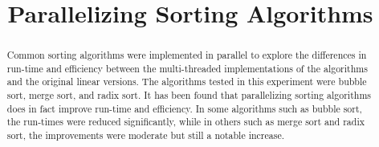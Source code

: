 \documentclass[conference]{IEEEtran}
\begin{document}
\title{Parallelizing Sorting Algorithms}

\author{
\and
{}
\and
{}
\and
{}
\and
{}
}

\maketitle

\begin{abstract}
Common sorting algorithms were implemented in parallel to explore the differences in run-time and efficiency between the multi-threaded implementations of the algorithms and the original linear versions. The algorithms tested in this experiment were bubble sort, merge sort, and radix sort. It has been found that parallelizing sorting algorithms does in fact improve run-time and efficiency. In some algorithms such as bubble sort, the run-times were reduced significantly, while in others such as merge sort and radix sort, the improvements were moderate but still a notable increase.

\end{abstract}
\end{document}
